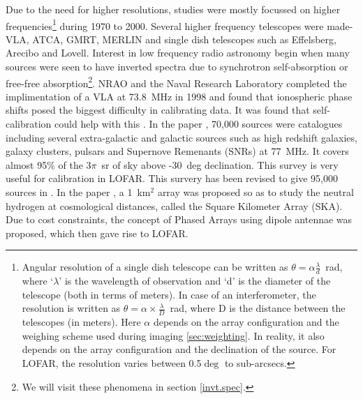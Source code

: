 \documentclass[../main/thesis_msc.tex]{subfiles}
\begin{document}
Due to the need for higher resolutions, studies were mostly focussed on higher frequencies\footnote{Angular resolution of a single dish telescope can be written as $\theta = \alpha\frac{\lambda}{d}$~rad, where `$\lambda$' is the wavelength of observation and `d' is the diameter of the telescope (both in terms of meters). In case of an interferometer, the resolution is written as $\theta = \alpha\times \frac{\lambda}{D}$~rad, where D is the distance between the telescopes (in meters). Here $\alpha$ depends on the array configuration and the weighing scheme used during imaging \ref{sec:weighting}. In reality, it also depends on the array configuration and the declination of the source. For LOFAR, the resolution varies between 0.5$\deg$ to sub-arcsecs.} during 1970 to 2000. Several higher frequency telescopes were made- VLA, ATCA, GMRT, MERLIN and single dish telescopes such as Effelsberg, Arecibo and Lovell. Interest in low frequency radio astronomy begin when many sources were seen to have inverted spectra due to synchrotron self-absorption or free-free absorption\footnote{We will visit these phenomena in section \ref{invt.spec}.}. NRAO and the Naval Research Laboratory completed the implimentation of a VLA at 73.8~MHz in 1998 and found that ionospheric phase shifts posed the biggest difficulty in calibrating data. It was found that self-calibration could help with this \citep{74MHz}. In the paper \citep{vlss}, 70,000 sources were catalogues including several extra-galactic and galactic sources such as high redshift galaxies, galaxy clusters, pulsars and Supernove Remenants (SNRs) at 77~MHz. It covers almost  95\% of the 3$\pi$~sr of sky above -30~deg declination. This survey is very useful for calibration in LOFAR. This survery has been revised to give 95,000 sources in \citep{vlss2}. In the paper \citep{ska}, a 1~km$^2$ array was proposed so as to study the neutral hydrogen at cosmological distances, called the Square Kilometer Array (SKA). Due to cost constraints, the concept of Phased Arrays \citep{lof1} using dipole antennae was proposed, which then gave rise to LOFAR.
\end{document}
